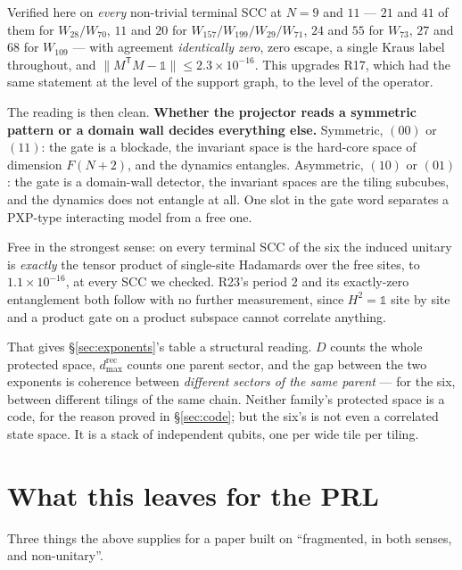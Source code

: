 \documentclass[11pt]{article}
\theoremstyle{plain}
\theoremstyle{remark}
\begin{document}
\noindent Verified here on \emph{every} non-trivial terminal SCC at $N = 9$ and
$11$ --- $21$ and $41$ of them for $W_{28}/W_{70}$, $11$ and $20$ for
$W_{157}/W_{199}/W_{29}/W_{71}$, $24$ and $55$ for $W_{73}$, $27$ and $68$ for
$W_{109}$ --- with agreement \emph{identically zero}, zero escape, a single Kraus
label throughout, and $\lVert M^{\mathsf T}M-\mathbb{1}\rVert \le
2.3\times10^{-16}$. This upgrades R17, which had the same statement at the level
of the support graph, to the level of the operator.

The reading is then clean. \textbf{Whether the projector reads a symmetric
pattern or a domain wall decides everything else.} Symmetric, $(00)$ or $(11)$:
the gate is a blockade, the invariant space is the hard-core space of dimension
$F(N+2)$, and the dynamics entangles. Asymmetric, $(10)$ or $(01)$: the gate is a
domain-wall detector, the invariant spaces are the tiling subcubes, and the
dynamics does not entangle at all. One slot in the gate word separates a PXP-type
interacting model from a free one.

Free in the strongest sense: on every terminal SCC of the six the induced
unitary is \emph{exactly} the tensor product of single-site Hadamards over the
free sites, to $1.1\times10^{-16}$, at every SCC we checked. R23's period $2$ and
its exactly-zero entanglement both follow with no further measurement, since
$H^2=\mathbb{1}$ site by site and a product gate on a product subspace cannot
correlate anything.

That gives \S\ref{sec:exponents}'s table a structural reading. $D$ counts the
whole protected space, $d^{\mathrm{rec}}_{\max}$ counts one parent sector, and
the gap between the two exponents is coherence between \emph{different sectors of
the same parent} --- for the six, between different tilings of the same chain.
Neither family's protected space is a code, for the reason proved in
\S\ref{sec:code}; but the six's is not even a correlated state space. It is a
stack of independent qubits, one per wide tile per tiling.

\section{What this leaves for the PRL}

Three things the above supplies for a paper built on ``fragmented, in both
senses, and non-unitary''.
\end{document}
